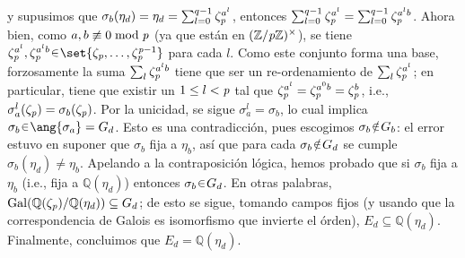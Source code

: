 \begin{sol}
\begin{enumerate}[label=\alph*)]
y supusimos que $\sigma_b(\eta_d) = \eta_d = \sum^{q-1}_{l=0} \zeta^{a^l}_{\operatorname{\textit{p}}}$, entonces $\sum^{q-1}_{l=0} \zeta^{a^l}_{\operatorname{\textit{p}}} = \sum^{q-1}_{l=0} \zeta^{a^lb}_{\operatorname{\textit{p}}}$. Ahora bien, como $a,b \not\equiv 0 \bmod {\operatorname{\textit{p}}}$ (ya que están en $(\mathbb{Z}/{\operatorname{\textit{p}}}\mathbb{Z})^\times$), se tiene $\zeta^{a^l}_{\p},\zeta^{a^lb}_{\p} \en \set{\zeta_{\p},\dots,\zeta_{\p}^{{\p}-1}}$ para cada $l$. Como este conjunto forma una base, forzosamente la suma $\sum_l \zeta^{a^lb}_{\operatorname{\textit{p}}}$ tiene que ser un re-ordenamiento de $\sum_{l} \zeta^{a^l}_{\operatorname{\textit{p}}}$; en particular, tiene que existir un $1 \leq l <{\operatorname{\textit{p}}}$ tal que $\zeta^{a^l}_{\operatorname{\textit{p}}} = \zeta^{a^0b}_{\operatorname{\textit{p}}} = \zeta^{b}_{\operatorname{\textit{p}}}$, i.e., $\sigma^l_{a}(\zeta_{\operatorname{\textit{p}}}) = \sigma_b(\zeta_{\operatorname{\textit{p}}})$. Por la unicidad, se sigue $\sigma^l_a = \sigma_b$, lo cual implica $\sigma_b \en \ang{\sigma_a} = G_d$. Esto es una contradicción, pues escogimos $\sigma_b \noten G_b$: el error estuvo en suponer que $\sigma_b$ fija a $\eta_b$, así que para cada $\sigma_b \noten G_d$ se cumple $\sigma_b(\eta_d) \neq \eta_b$. Apelando a la contraposición lógica, hemos probado que si $\sigma_b$ fija a $\eta_b$ (i.e., fija a $\mathbb{Q}(\eta_d)$) entonces $\sigma_b \en G_d$. En otras palabras, $\operatorname{Gal}(\mathbb{Q}(\zeta_{\operatorname{\textit{p}}})/\mathbb{Q}(\eta_d)) \subseteq G_d$; de esto se sigue, tomando campos fijos (y usando que la correspondencia de Galois es isomorfismo que invierte el órden), $E_d \subseteq \mathbb{Q}(\eta_d)$. Finalmente, concluimos que $E_d = \mathbb{Q}(\eta_d)$. \qedhere
\end{enumerate}
\end{sol}